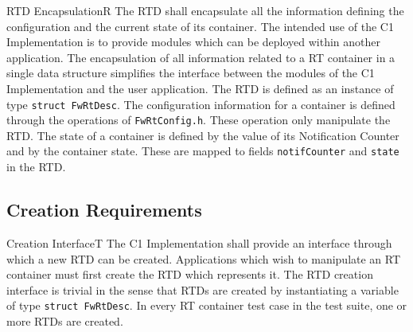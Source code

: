 \documentclass[requirements]{../fwprofile}
\begin{document}
\begin{fw_req}{RTD Encapsulation}{R}
{The RTD shall encapsulate all the information defining the configuration and the current state of its container.}
{The intended use of the C1 Implementation is to provide modules which can be deployed within another application. The encapsulation of all information related to a RT container in a single data structure simplifies the interface between the modules of the C1 Implementation and the user application.}
{The RTD is defined as an instance of type \texttt{struct FwRtDesc}.} 
{The configuration information for a container is defined through the operations of \texttt{FwRtConfig.h}. These operation only manipulate the RTD. The state of a container is defined by the value of its Notification Counter and by the container state. These are mapped to fields \texttt{notifCounter} and \texttt{state} in the RTD.}
\end{fw_req}  

\subsection{Creation Requirements}\label{req:creationInterfaceRTD}

\begin{fw_req}{Creation Interface}{T}
{ The C1 Implementation shall provide an interface through which a new RTD 
can be created.}
{Applications which wish to manipulate an RT container must first create the 
RTD which represents it.}
{The RTD creation interface is trivial in the sense that RTDs are created by instantiating a variable of type \texttt{struct FwRtDesc}.} 
{In every RT container test case in the test suite, one or more RTDs are created.}
\end{fw_req}
\end{document}
